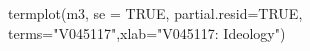 \begin{Schunk}
\begin{Sinput}
 termplot(m3, se = TRUE, partial.resid=TRUE, terms="V045117",xlab="V045117: Ideology")
\end{Sinput}
\end{Schunk}
